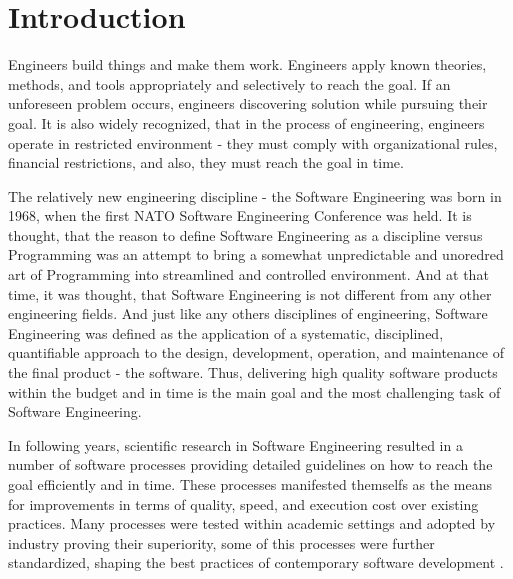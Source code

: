 \chapter{Introduction}
Engineers build things and make them work. Engineers apply known theories, methods, 
and tools appropriately and selectively to reach the goal. If an unforeseen problem occurs, 
engineers discovering solution while pursuing their goal. It is also widely recognized, 
that in the process of engineering, engineers operate in restricted environment - they 
must comply with organizational rules, financial restrictions, and also, they must 
reach the goal in time. 

The relatively new engineering discipline - the Software Engineering was born in 1968, 
when the first NATO Software Engineering Conference was held. It is thought, that the reason
to define Software Engineering as a discipline versus Programming was an attempt to bring 
a somewhat unpredictable and unoredred art of Programming into streamlined and controlled 
environment. And at that time, it was thought, that Software Engineering is not different 
from any other engineering fields. And just like any others disciplines of engineering, 
Software Engineering was defined as the application of a systematic, disciplined, quantifiable 
approach to the design, development, operation, and maintenance of the final product - the software.
Thus, delivering high quality software products within the budget and in time is the main goal 
and the most challenging task of Software Engineering.

In following years, scientific research in Software Engineering resulted in a number of software 
processes providing detailed guidelines on how to reach the goal efficiently and in time. 
These processes manifested themselfs as the means for improvements in terms of quality, 
speed, and execution cost over existing practices. Many processes were tested within academic 
settings and adopted by industry proving their superiority, some of this processes were 
further standardized, shaping the best practices of contemporary software development \cite{citeulike:9962021}. 

